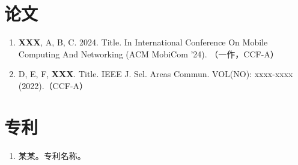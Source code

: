 \newcommand{\me}{\textbf{XXX}}

\section*{论文}
\begin{enumerate}
    \renewcommand{\labelenumi}{[\theenumi] }
    \item \me, A, B, C. 2024. Title. In International Conference On Mobile Computing And Networking (ACM MobiCom '24). （一作，CCF-A）
    \item D, E, F, \me. Title. IEEE J. Sel. Areas Commun. VOL(NO): xxxx-xxxx (2022).（CCF-A）
\end{enumerate}

\section*{专利}
\begin{enumerate}
    \renewcommand{\labelenumi}{[\theenumi] }
    \item 某某。专利名称。
\end{enumerate}
